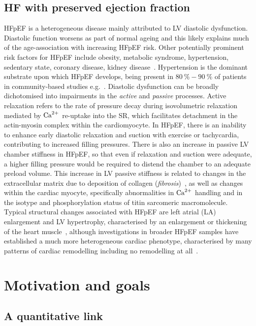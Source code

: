 \subsection{HF with preserved ejection fraction}
HFpEF is a heterogeneous disease mainly attributed to LV diastolic dysfunction. Diastolic function worsens as part of normal ageing \cite{Andersen:2014} and this likely explains much of the age-association with increasing HFpEF risk. Other potentially prominent risk factors for HFpEF include obesity, metabolic syndrome, hypertension, sedentary state, coronary disease, kidney disease~\cite{Pfeffer:2019}. Hypertension is the dominant substrate upon which HFpEF develops, being present in $\SI{80}{\percent}-\SI{90}{\percent}$ of patients in community-based studies e.g.~\cite{Borlaug:2009}. Diastolic dysfunction can be broadly dichotomised into impairments in the \textit{active} and \textit{passive} processes. Active relaxation refers to the rate of pressure decay during isovolumetric relaxation mediated by $\textrm{Ca}^{2+}$ re-uptake into the SR, which facilitates detachment in the actin-myosin complex within the cardiomyocyte. In HFpEF, there is an inability to enhance early diastolic relaxation and suction with exercise or tachycardia, contributing to increased filling pressures. There is also an increase in passive LV chamber stiffness in HFpEF, so that even if relaxation and suction were adequate, a higher filling pressure would be required to distend the chamber to an adequate preload volume. This increase in LV passive stiffness is related to changes in the extracellular matrix due to deposition of collagen (\textit{fibrosis})~\cite{Burlew:2002}, as well as changes within the cardiac myocyte, specifically abnormalities in $\textrm{Ca}^{2+}$ handling and in the isotype and phosphorylation status of titin sarcomeric macromolecule. Typical structural changes associated with HFpEF are left atrial (LA) enlargement and LV hypertrophy, characterised by an enlargement or thickening of the heart muscle~\cite{Zile:2004}, although investigations in broader HFpEF samples have established a much more heterogeneous cardiac phenotype, characterised by many patterns of cardiac remodelling including no remodelling at all~\cite{Shah:2012}.


%
%
%
\section{Motivation and goals}


%
%
%
\subsection{A quantitative link}

